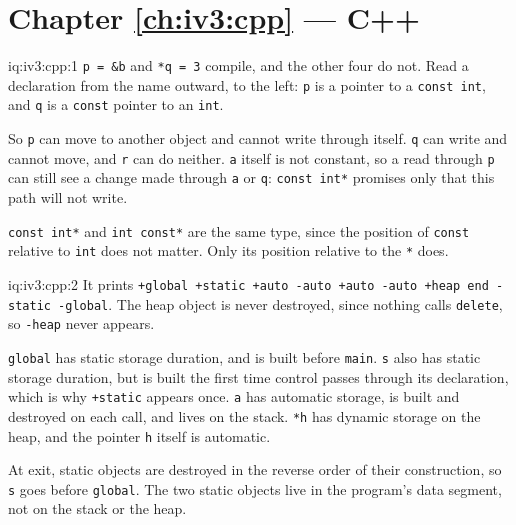 \section*{Chapter \ref{ch:iv3:cpp} --- C++}

\begin{solution}{iq:iv3:cpp:1}
\texttt{p = \&b} and \texttt{*q = 3} compile, and the other four do not. Read a declaration from the name outward, to the left: \texttt{p} is a pointer to a \texttt{const int}, and \texttt{q} is a \texttt{const} pointer to an \texttt{int}.

So \texttt{p} can move to another object and cannot write through itself. \texttt{q} can write and cannot move, and \texttt{r} can do neither. \texttt{a} itself is not constant, so a read through \texttt{p} can still see a change made through \texttt{a} or \texttt{q}: \texttt{const int*} promises only that this path will not write.

\texttt{const int*} and \texttt{int const*} are the same type, since the position of \texttt{const} relative to \texttt{int} does not matter. Only its position relative to the \texttt{*} does.

\end{solution}

\begin{solution}{iq:iv3:cpp:2}
It prints \texttt{+global +static +auto -auto +auto -auto +heap end -static -global}. The heap object is never destroyed, since nothing calls \texttt{delete}, so \texttt{-heap} never appears.

\texttt{global} has static storage duration, and is built before \texttt{main}. \texttt{s} also has static storage duration, but is built the first time control passes through its declaration, which is why \texttt{+static} appears once. \texttt{a} has automatic storage, is built and destroyed on each call, and lives on the stack. \texttt{*h} has dynamic storage on the heap, and the pointer \texttt{h} itself is automatic.

At exit, static objects are destroyed in the reverse order of their construction, so \texttt{s} goes before \texttt{global}. The two static objects live in the program's data segment, not on the stack or the heap.

\end{solution}

